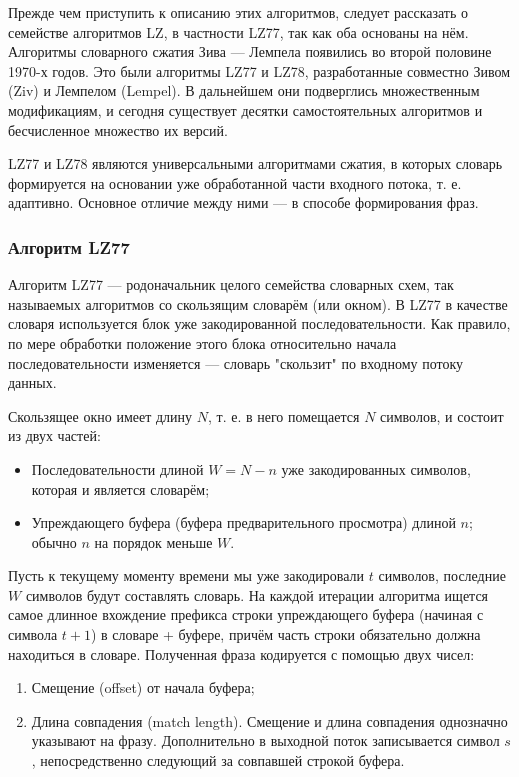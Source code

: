 \documentclass[12pt]{article}
\begin{document}
Прежде чем приступить к описанию этих алгоритмов, следует рассказать
о семействе алгоритмов LZ, в частности LZ77, так как оба основаны на нём.
Алгоритмы словарного сжатия Зива — Лемпела появились во второй половине 1970-х годов.
Это были алгоритмы LZ77 и LZ78, разработанные совместно
Зивом (Ziv) и Лемпелом (Lempel). В дальнейшем они подверглись множественным
модификациям, и сегодня существует десятки самостоятельных алгоритмов
и бесчисленное множество их версий.

LZ77 и LZ78 являются универсальными алгоритмами сжатия,
в которых словарь формируется на основании уже обработанной части входного потока,
т. е. адаптивно. Основное отличие между ними — в способе формирования фраз.

\subsubsection{Алгоритм LZ77}

Алгоритм LZ77 — родоначальник целого семейства словарных схем,
так называемых алгоритмов со скользящим словарём (или окном).
В LZ77 в качестве словаря используется блок уже закодированной последовательности.
Как правило, по мере обработки положение этого блока относительно начала
последовательности изменяется — словарь "скользит" по входному потоку данных.

Скользящее окно имеет длину $N$, т. е. в него помещается $N$ символов, и состоит из двух частей:

\begin{itemize}
\item Последовательности длиной $W = N - n$ уже закодированных символов, которая и является словарём;
\item Упреждающего буфера (буфера предварительного просмотра) длиной $n$; обычно $n$ на порядок меньше $W$.
\end{itemize}

Пусть к текущему моменту времени мы уже закодировали $t$ символов, последние $W$ символов будут
составлять словарь. На каждой итерации алгоритма ищется самое длинное вхождение префикса
строки упреждающего буфера (начиная с символа $t+1$) в словаре + буфере,
причём часть строки обязательно должна находиться в словаре. Полученная фраза
кодируется с помощью двух чисел:

\begin{enumerate}
\item Смещение (offset) от начала буфера;
\item Длина совпадения (match length).
Смещение и длина совпадения однозначно указывают на фразу.
Дополнительно в выходной поток записывается символ $s$,
непосредственно следующий за совпавшей строкой буфера.
\end{enumerate}
\end{document}
